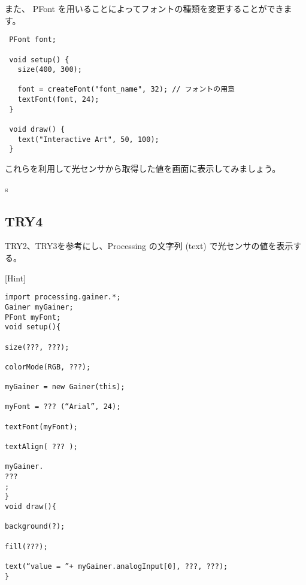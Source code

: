 \documentclass[11pt,a4paper]{jarticle}
\begin{document}
また、 PFont を用いることによってフォントの種類を変更することができます。
\begin{lstlisting}
 PFont font;

 void setup() {
   size(400, 300);
 
   font = createFont("font_name", 32); // フォントの用意
   textFont(font, 24);
 }

 void draw() {
   text("Interactive Art", 50, 100);
 }
\end{lstlisting}

これらを利用して光センサから取得した値を画面に表示してみましょう。


s%
  
 

\subsection*{TRY4}
TRY2、TRY3を参考にし、Processing の文字列 (text) で光センサの値を表示する。

[Hint]
\begin{lstlisting}
import processing.gainer.*;
Gainer myGainer;
PFont myFont;
void setup(){
	
size(???, ???);
	
colorMode(RGB, ???);
	
myGainer = new Gainer(this);
	
myFont = ??? (“Arial”, 24);
	
textFont(myFont);
	
textAlign( ??? );
	
myGainer.
???
;
}
void draw(){
	
background(?);
	
fill(???);
	
text(“value = ”+ myGainer.analogInput[0], ???, ???);
}
 
\end{lstlisting}
\end{document}

